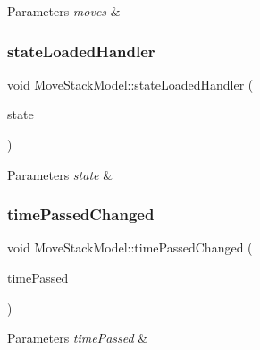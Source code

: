 \begin{DoxyParams}{Parameters}
{\em moves} & \\
\hline
\end{DoxyParams}
\mbox{\label{class_move_stack_model_a2c8028466c62b5f8b269b71939c56ef8}} 
\subsubsection{\texorpdfstring{stateLoadedHandler}{stateLoadedHandler}}
{\footnotesize\ttfamily void Move\+Stack\+Model\+::state\+Loaded\+Handler (\begin{DoxyParamCaption}\item[{const \mbox{\hyperlink{struct_load_state}{Load\+State}} \&}]{state }\end{DoxyParamCaption})\hspace{0.3cm}{\ttfamily [slot]}}


\begin{DoxyParams}{Parameters}
{\em state} & \\
\hline
\end{DoxyParams}
\mbox{\label{class_move_stack_model_aa7d3186093032e523b2a7bbefa74f8fb}} 
\subsubsection{\texorpdfstring{timePassedChanged}{timePassedChanged}}
{\footnotesize\ttfamily void Move\+Stack\+Model\+::time\+Passed\+Changed (\begin{DoxyParamCaption}\item[{const size\+\_\+t \&}]{time\+Passed }\end{DoxyParamCaption})\hspace{0.3cm}{\ttfamily [signal]}}


\begin{DoxyParams}{Parameters}
{\em time\+Passed} & \\
\hline
\end{DoxyParams}
\mbox{\label{class_move_stack_model_a59f08def53913e4f33df7fe30a16dc75}} 
